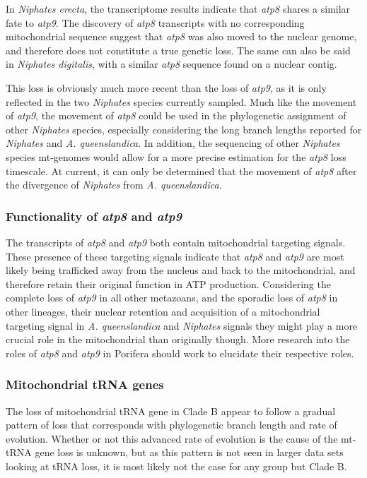 \documentclass[../main.tex]{subfiles}
\begin{document}
In \emph{Niphates erecta}, the transcriptome results indicate that \emph{atp8} shares a similar fate to \emph{atp9}. The discovery of \emph{atp8} transcripts with no corresponding mitochondrial sequence suggest that \emph{atp8} was also moved to the nuclear genome, and therefore does not constitute a true genetic loss. The same can also be said in \emph{Niphates digitalis}, with a similar \emph{atp8} sequence found on a nuclear contig.

This loss is obviously much more recent than the loss of \emph{atp9}, as it is only reflected in the two \emph{Niphates} species currently sampled. Much like the movement of \emph{atp9}, the movement of \emph{atp8} could be used in the phylogenetic assignment of other \emph{Niphates} species, especially considering the long branch lengths reported for \emph{Niphates} and \emph{A. queenslandica}. In addition, the sequencing of other \emph{Niphates} species mt-genomes would allow for a more precise estimation for the \emph{atp8} loss timescale. At current, it can only be determined that the movement of \emph{atp8} after the divergence of \emph{Niphates} from \emph{A. queenslandica}.

\subsubsection{Functionality of \emph{atp8} and \emph{atp9}}

The transcripts of \emph{atp8} and \emph{atp9} both contain mitochondrial targeting signals. These presence of these targeting signals indicate that \emph{atp8} and \emph{atp9} are most likely being trafficked away from the nucleus and back to the mitochondrial, and therefore retain their original function in ATP production. Considering the complete loss of \emph{atp9} in all other metazoans, and the sporadic loss of \emph{atp8} in other lineages, their nuclear retention and acquisition of a mitochondrial targeting signal in \emph{A. queenslandica} and \emph{Niphates} signals they might play a more crucial role in the mitochondrial than originally though. More research into the roles of \emph{atp8} and \emph{atp9} in Porifera should work to elucidate their respective roles.

\subsubsection{Mitochondrial tRNA genes}

The loss of mitochondrial tRNA gene in Clade B appear to follow a gradual pattern of loss that corresponds with phylogenetic branch length and rate of evolution. Whether or not this advanced rate of evolution is the cause of the mt-tRNA gene loss is unknown, but as this pattern is not seen in larger data sets looking at tRNA loss, it is most likely not the case for any group but Clade B. 
\end{document}
